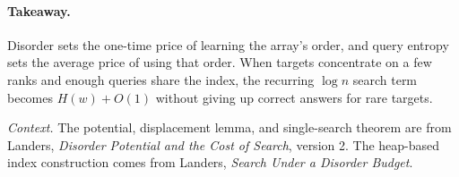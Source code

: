 \documentclass[11pt,letterpaper]{article}
\begin{document}
\paragraph{Takeaway.}
Disorder sets the one-time price of learning the array's order, and
query entropy sets the average price of using that order. When targets
concentrate on a few ranks and enough queries share the index, the
recurring $\log n$ search term becomes $H(w)+O(1)$ without giving up
correct answers for rare targets.

\smallskip
{\footnotesize\emph{Context.} The potential, displacement lemma, and
single-search theorem are from Landers,
\emph{Disorder Potential and the Cost of Search}, version 2.
The heap-based index construction comes from Landers,
\emph{Search Under a Disorder Budget}.}
\end{document}
